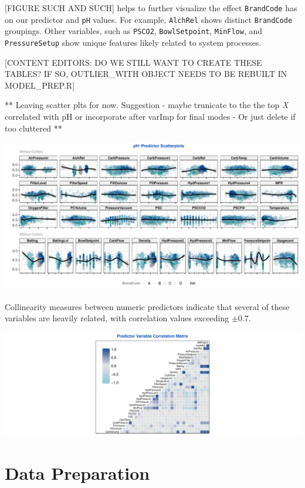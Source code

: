 \documentclass[]{report}
\begin{document}
{[}FIGURE SUCH AND SUCH{]} helps to further visualize the effect
\texttt{BrandCode} has on our predictor and \texttt{pH} values. For
example, \texttt{AlchRel} shows distinct \texttt{BrandCode} groupings.
Other variables, such as \texttt{PSCO2}, \texttt{BowlSetpoint},
\texttt{MinFlow}, and \texttt{PressureSetup} show unique features likely
related to system processes.

{[}CONTENT EDITORS: DO WE STILL WANT TO CREATE THESE TABLES? IF SO,
OUTLIER\_WITH OBJECT NEEDS TO BE REBUILT IN MODEL\_PREP.R{]}

** Leaving scatter plts for now. Suggestion - maybe trunicate to the the
top \emph{X} correlated with pH or incorporate after varImp for final
modes - Or just delete if too cluttered **

\includegraphics{CONFLICT_Project_Update_files/figure-latex/unnamed-chunk-5-1.pdf}

Collinearity measures between numeric predictors indicate that several
of these variables are heavily related, with correlation values
exceeding \(\pm{0.7}\).

\includegraphics{CONFLICT_Project_Update_files/figure-latex/unnamed-chunk-6-1.pdf}

\hypertarget{data-preparation}{%
\chapter{Data Preparation}\label{data-preparation}}
\end{document}
